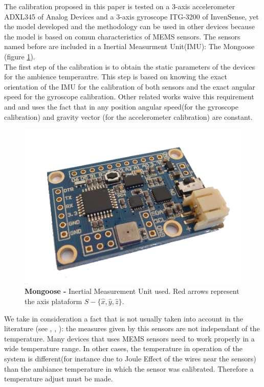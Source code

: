 \documentclass[conference]{IEEEtran}
\begin{document}
The calibration proposed in this paper is tested on a 3-axis accelerometer ADXL345 of Analog Devices and a 3-axis gyroscope ITG-3200  of InvenSense, yet the model developed and the methodology can be used in other devices because the model is based on comun characteristics of MEMS sensors. The sensors named before are included in a Inertial Measurment Unit(IMU): The Mongoose (figure \ref{fig:mongoose}). \\


The first step of the calibration is to obtain the static parameters of the devices for the ambience temperautre. This step is based on knowing the exact orientation of the IMU for the calibration of both sensors and the exact angular speed for the gyroscope calibration. Other related works waive this requirement\cite{bib:calib_imu} and \cite{bib:kalman} and uses the fact that in any position angular speed(for the gyroscope calibration) and gravity vector (for the accelerometer calibration) are constant.\\

\begin{figure}[h]
	\centering
	\includegraphics[width=.6\columnwidth]{./pics_paper/mongoose.png}
	\caption{\textbf{Mongoose -} Inertial Measurement Unit used. Red arrows represent the axis plataform $S - \{\hat{x}, \hat{y}, \hat{z} \}$. }
	\label{fig:mongoose}
\end{figure}

We take in consideration a fact that is not usually taken into account in the literature (see \cite{bib:calib_imu}, \cite{bib:kalman}, \cite{bib:calib_imu_dos}): the measures given by this sensors are not independant of the temperature. Many devices that uses MEMS sensors need to work properly in a wide temperature range. In other cases, the temperature in operation of the system is different(for instance due to Joule Effect of the wires near the sensors) than the ambiance temperature in which the sensor was calibrated. Therefore a temperature adjust must be made.
   
\end{document}
